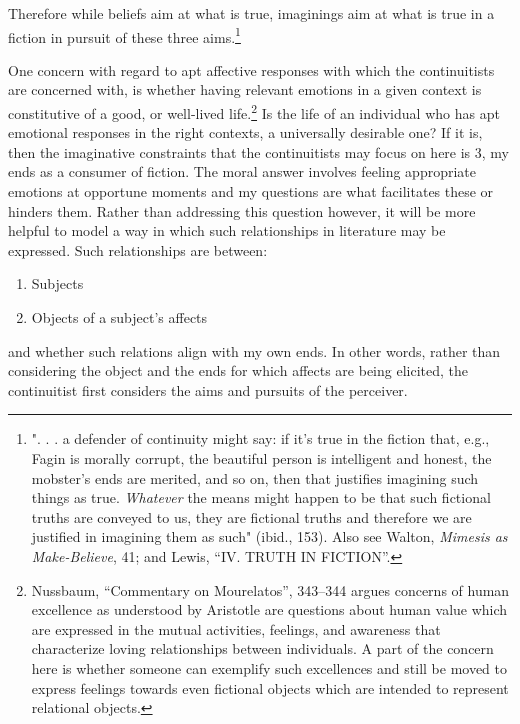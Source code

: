 \documentclass[phdthesis,12pt,final]{wuthesis}
\theoremstyle{definition}
\theoremstyle{definition}
\theoremstyle{definition}
\theoremstyle{definition}
\theoremstyle{remark}
\begin{document}
\noindent Therefore while beliefs aim at what is true, imaginings aim at what is true in a fiction in pursuit of these three aims.\footnote{". . . a defender of continuity might say: if it's true in the fiction that, e.g., Fagin is morally corrupt, the beautiful person is intelligent and honest, the mobster's ends are merited, and so on, then that justifies imagining such things as true. \emph{Whatever} the means might happen to be that such fictional truths are conveyed to us, they are fictional truths and therefore we are justified in imagining them as such" (ibid., 153). Also see Walton, \emph{Mimesis as {Make-Believe}}, 41; and Lewis, {``{IV}. {TRUTH IN FICTION}''}.}

One concern with regard to apt affective responses with which the continuitists are concerned with, is whether having relevant emotions in a given context is constitutive of a good, or well-lived life.\footnote{Nussbaum, {``Commentary on {Mourelatos}''}, 343--344 argues concerns of human excellence as understood by Aristotle are questions about human value which are expressed in the mutual activities, feelings, and awareness that characterize loving relationships between individuals. A part of the concern here is whether someone can exemplify such excellences and still be moved to express feelings towards even fictional objects which are intended to represent relational objects.} Is the life of an individual who has apt emotional responses in the right contexts, a universally desirable one? If it is, then the imaginative constraints that the continuitists may focus on here is 3, my ends as a consumer of fiction. The moral answer involves feeling appropriate emotions at opportune moments and my questions are what facilitates these or hinders them. Rather than addressing this question however, it will be more helpful to model a way in which such relationships in literature may be expressed. Such relationships are between:

\begin{enumerate}
\def\labelenumi{\arabic{enumi}.}
\tightlist
\item
  Subjects
\item
  Objects of a subject's affects
\end{enumerate}

\noindent and whether such relations align with my own ends. In other words, rather than considering the object and the ends for which affects are being elicited, the continuitist first considers the aims and pursuits of the perceiver.
\end{document}
